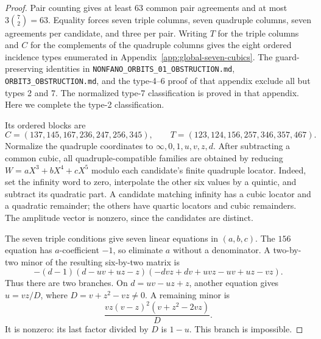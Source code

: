\begin{proof}
Pair counting gives at least $63$ common pair agreements and at most
$3\binom72=63$.  Equality forces seven triple columns, seven quadruple
columns, seven agreements per candidate, and three per pair.  Writing
$T$ for the triple columns and $C$ for the complements of the quadruple
columns gives the eight ordered incidence types enumerated in
Appendix~\ref{app:global-seven-cubics}.  The guard-preserving identities
in \texttt{NONFANO\_ORBITS\_01\_OBSTRUCTION.md},
\texttt{ORBIT3\_OBSTRUCTION.md}, and the type-4--6 proof of that
appendix exclude all but types 2 and 7.
The normalized type-7 classification is proved in that appendix.
Here we complete the type-2 classification.

Its ordered blocks are
\[
 C=(137,145,167,236,247,256,345),\qquad
 T=(123,124,156,257,346,357,467).
\]
Normalize the quadruple coordinates to $\infty,0,1,u,v,z,d$.
After subtracting a common cubic, all quadruple-compatible families are
obtained by reducing
$W=aX^3+bX^4+cX^5$ modulo each candidate's finite quadruple locator.
Indeed, set the infinity word to zero, interpolate the other six values
by a quintic, and subtract its quadratic part.  A candidate matching
infinity has a cubic locator and a quadratic remainder; the others
have quartic locators and cubic remainders.  The amplitude vector is
nonzero, since the candidates are distinct.

The seven triple conditions give seven linear equations in $(a,b,c)$.
The $156$ equation has $a$-coefficient $-1$, so eliminate $a$ without
a denominator.  A two-by-two minor of the resulting six-by-two matrix is
\[
 -(d-1)(d-uv+uz-z)(-dvz+dv+uvz-uv+uz-vz).
\]
Thus there are two branches.  On $d=uv-uz+z$, another equation gives
$u=vz/D$, where $D=v+z^2-vz\ne0$.  A remaining minor is
\[
 \frac{vz(v-z)^2(v+z^2-2vz)}D.
\]
It is nonzero: its last factor divided by $D$ is $1-u$.
This branch is impossible.


\end{proof}
